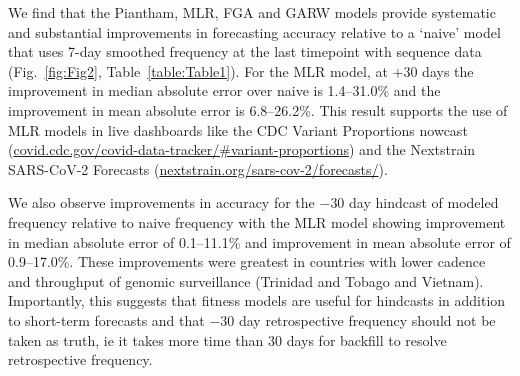 \documentclass[10pt,letterpaper]{article}
\begin{document}

\sloppy %
We find that the Piantham, MLR, FGA and GARW models provide systematic and substantial improvements in forecasting accuracy relative to a `naive' model that uses 7-day smoothed frequency at the last timepoint with sequence data (Fig.~\ref{fig:Fig2}, Table~\ref{table:Table1}).
For the MLR model, at $+30$ days the improvement in median absolute error over naive is 1.4--31.0\% and the improvement in mean absolute error is 6.8--26.2\%.
This result supports the use of MLR models in live dashboards like the CDC Variant Proportions nowcast (\href{https://covid.cdc.gov/covid-data-tracker/\#variant-proportions}{covid.cdc.gov/covid-data-tracker/\#variant-proportions}) and the Nextstrain SARS-CoV-2 Forecasts (\href{https://nextstrain.org/sars-cov-2/forecasts/}{nextstrain.org/sars-cov-2/forecasts/}).

We also observe improvements in accuracy for the $-30$ day hindcast of modeled frequency relative to naive frequency with the MLR model showing improvement in median absolute error of 0.1--11.1\% and improvement in mean absolute error of 0.9--17.0\%.
These improvements were greatest in countries with lower cadence and throughput of genomic surveillance (Trinidad and Tobago and Vietnam).
Importantly, this suggests that fitness models are useful for hindcasts in addition to short-term forecasts and that $-30$ day retrospective frequency should not be taken as truth, ie it takes more time than 30 days for backfill to resolve retrospective frequency.

\end{document}
